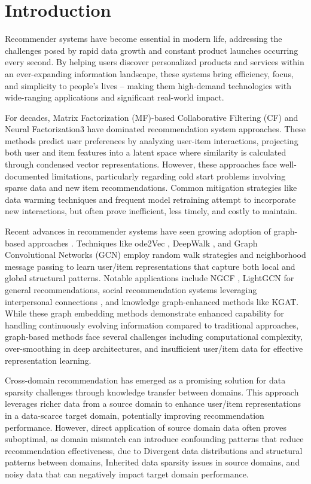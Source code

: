 \section{Introduction}

Recommender systems have become essential in modern life, addressing the challenges posed by rapid data growth and constant product launches occurring every second. By helping users discover personalized products and services within an ever-expanding information landscape, these systems bring efficiency, focus, and simplicity to people's lives – making them high-demand technologies with wide-ranging applications and significant real-world impact.


For decades, Matrix Factorization (MF)-based \cite{koren2009matrix}  Collaborative Filtering (CF)  \cite{herlocker2004evaluating} and Neural Factorization3 have dominated recommendation system approaches. These methods predict user preferences by analyzing user-item interactions, projecting both user and item features into a latent space where similarity is calculated through condensed vector representations. However, these approaches face well-documented limitations, particularly regarding cold start problems involving sparse data and new item recommendations. Common mitigation strategies like data warming techniques and frequent model retraining attempt to incorporate new interactions, but often prove inefficient, less timely, and costly to maintain.

Recent advances in recommender systems have seen growing adoption of graph-based approaches \cite{mao2016multirelational,wang2016member}. Techniques like ode2Vec \cite{grover2016node2vec}, DeepWalk \cite{perozzi2014deepwalk}, and Graph Convolutional Networks (GCN) \cite{kipf2016semi} employ random walk strategies and neighborhood message passing to learn user/item representations that capture both local and global structural patterns. Notable applications include NGCF \cite{wang2019neural}, LightGCN for general recommendations, social recommendation systems leveraging interpersonal connections \cite{sun2011pathsim}, and knowledge graph-enhanced methods like KGAT. While these graph embedding methods demonstrate enhanced capability for handling continuously evolving information compared to traditional approaches, graph-based methods face several challenges including computational complexity, over-smoothing in deep architectures, and insufficient user/item data for effective representation learning.

Cross-domain recommendation has emerged as a promising solution for data sparsity challenges through knowledge transfer between domains. This approach leverages richer data from a source domain to enhance user/item representations in a data-scarce target domain, potentially improving recommendation performance. \cite{zhao2019cross, wang2019recsys} However, direct application of source domain data often proves suboptimal, as domain mismatch can introduce confounding patterns that reduce recommendation effectiveness, due to Divergent data distributions and structural patterns between domains, Inherited data sparsity issues in source domains, and noisy data that can negatively impact target domain performance.

